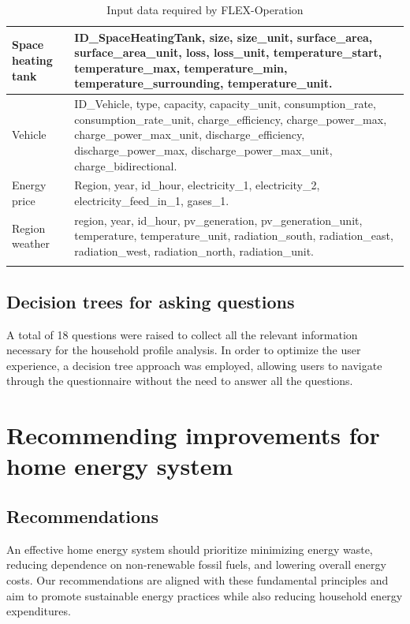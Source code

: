 \begin{center}
\begin{longtable}{ | p{} | p{} | }
            \hline 
            Space heating tank & ID\_SpaceHeatingTank, size, size\_unit, surface\_area, surface\_area\_unit, loss, loss\_unit, temperature\_start, temperature\_max, temperature\_min, temperature\_surrounding, temperature\_unit. \\
            \hline 
            Vehicle & ID\_Vehicle, type, capacity, capacity\_unit, consumption\_rate, consumption\_rate\_unit, charge\_efficiency, charge\_power\_max, charge\_power\_max\_unit, discharge\_efficiency, discharge\_power\_max, discharge\_power\_max\_unit, charge\_bidirectional. \\
            \hline 
            Energy price & Region, year, id\_hour, electricity\_1, electricity\_2, electricity\_feed\_in\_1, gases\_1. \\
            \hline 
            Region weather & region, year, id\_hour, pv\_generation, pv\_generation\_unit, temperature, temperature\_unit, radiation\_south, radiation\_east, radiation\_west, radiation\_north, radiation\_unit. \\
            \hline 
        
        \caption{Input data required by FLEX-Operation}
        \label{tab:dataset}
    \end{longtable}
\end{center}


\subsection{Decision trees for asking questions}

A total of 18 questions were raised to collect all the relevant information necessary for the household profile analysis. 
In order to optimize the user experience, a decision tree approach was employed, allowing users to navigate through the questionnaire without the need to answer all the questions. 


\section{Recommending improvements for home energy system}

\subsection{Recommendations}

An effective home energy system should prioritize minimizing energy waste, reducing dependence on non-renewable fossil fuels, and lowering overall energy costs. Our recommendations are aligned with these fundamental principles and aim to promote sustainable energy practices while also reducing household energy expenditures. 

